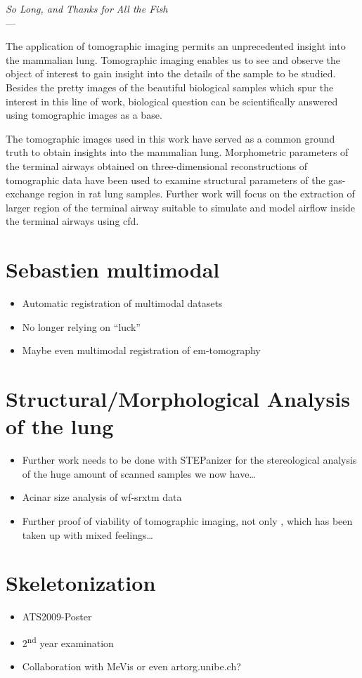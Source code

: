 \acresetall
{}\label{ch:outlook}
\begin{flushright}{\slshape    
		So Long, and Thanks for All the Fish} \\ \medskip
    ---  \citep{Adams1984}
\end{flushright}

\vfill

The application of tomographic imaging permits an unprecedented insight into the mammalian lung. Tomographic imaging enables us to see and observe the object of interest to gain insight into the details of the sample to be studied. Besides the pretty images of the beautiful biological samples which spur the interest in this line of work, biological question can be scientifically answered using tomographic images as a base.

The tomographic images used in this work have served as a common ground truth to obtain insights into the mammalian lung. Morphometric parameters of the terminal airways obtained on three-dimensional reconstructions of tomographic data have been used to examine structural parameters of the gas-exchange region in rat lung samples. Further work will focus on the extraction of larger region of the terminal airway suitable to simulate and model airflow inside the terminal airways using \ac{cfd}.
 
\section{Sebastien multimodal}
\begin{itemize}
	\item Automatic registration of multimodal datasets
	\item No longer relying on ``luck''
	\item Maybe even multimodal registration of \ac{em}-tomography
\end{itemize}

\section{Structural/Morphological Analysis of the lung}
\begin{itemize}
	\item Further work needs to be done with STEPanizer for the stereological analysis of the huge amount of scanned samples we now have\ldots
	\item Acinar size analysis of \ac{wf-srxtm} data
	\item Further proof of viability of tomographic imaging, not only \cite{Tsuda2008}, which has been taken up with mixed feelings\ldots
\end{itemize}

\section{Skeletonization}
\begin{itemize}
	\item ATS2009-Poster
	\item 2\textsuperscript{nd} year examination
	\item Collaboration with MeVis or even artorg.unibe.ch?
\end{itemize}

